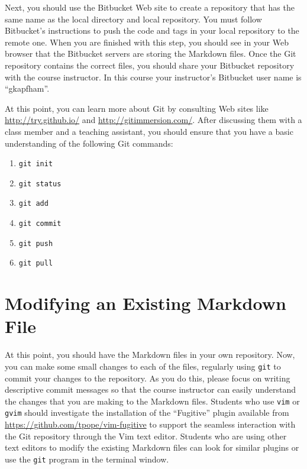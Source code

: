 Next, you should use the Bitbucket Web site to create a repository that has the same name as the local directory and
local repository.  You must follow Bitbucket's instructions to push the code and tags in your local repository to the
remote one. When you are finished with this step, you should see in your Web browser that the Bitbucket servers are
storing the Markdown files. Once the Git repository contains the correct files, you should share your Bitbucket repository
with the course instructor. In this course your instructor's Bitbucket user name is ``gkapfham''.

At this point, you can learn more about Git by consulting Web sites like \url{http://try.github.io/} and
\url{http://gitimmersion.com/}.  After discussing them with a class member and a teaching assistant, you should ensure
that you have a basic understanding of the following Git commands:

\vspace*{-.125in}
\begin{enumerate}
  \setlength{\itemsep}{-.03in}
  \item {\tt git init}
  \item {\tt git status}
  \item {\tt git add}
  \item {\tt git commit}
  \item {\tt git push}
  \item {\tt git pull}
\end{enumerate}
\vspace*{-.15in}

\section*{Modifying an Existing Markdown File}

At this point, you should have the Markdown files in your own repository. Now, you can make some small changes to each
of the files, regularly using {\tt git} to commit your changes to the repository. As you do this, please focus on
writing descriptive commit messages so that the course instructor can easily understand the changes that you are making
to the Markdown files. Students who use {\tt vim} or {\tt gvim} should investigate the installation of the ``Fugitive''
plugin available from \url{https://github.com/tpope/vim-fugitive} to support the seamless interaction with the Git
repository through the Vim text editor. Students who are using other text editors to modify the existing Markdown files
can look for similar plugins or use the {\tt git} program in the terminal window.

